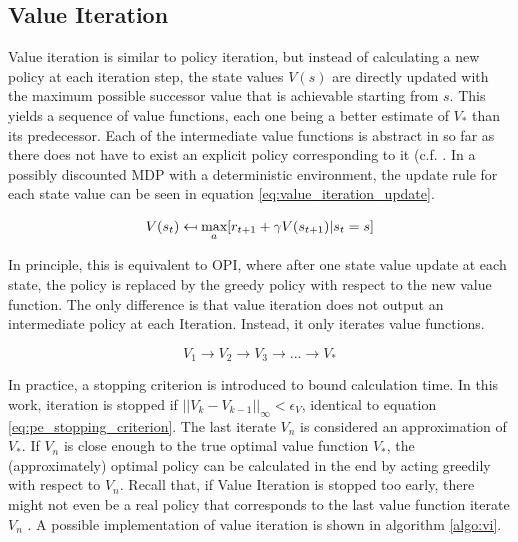 \subsection{Value Iteration}
\label{subsection:VI}
Value iteration is similar to policy iteration, but instead of calculating a new policy at each iteration step, the state values $V(s)$ are directly updated with the maximum possible successor value that is achievable starting from $s$. This yields a sequence of value functions, each one being a better estimate of $V_*$ than its predecessor. Each of the intermediate value functions is abstract in so far as there does not have to exist an explicit policy corresponding to it (c.f. \cite[lecture~3]{Silver2015}. In a possibly discounted MDP with a deterministic environment, the update rule for each state value can be seen in equation \ref{eq:value_iteration_update}.

\begin{equation}
V(s_t) \mathrel{\reflectbox{\ensuremath{\mapsto}}} 
\underset{a}{\text{max}}[r_{t+1}+\gamma V(s_{t+1})|s_t=s]
\label{eq:value_iteration_update}
\end{equation}

In principle, this is equivalent to OPI, where after one state value update at each state, the policy is replaced by the greedy policy with respect to the new value function. The only difference is that value iteration does not output an intermediate policy at each Iteration. Instead, it only iterates value functions. 

\begin{equation*}
V_1 \longrightarrow V_2 \longrightarrow V_3 \longrightarrow ... \longrightarrow  V_*
\label{eq:vi_scheme}
\end{equation*}

In practice, a stopping criterion is introduced to bound calculation time. In this work, iteration is stopped if $||V_{k}-V_{k-1}||_\infty<\epsilon_V$, identical to equation \ref{eq:pe_stopping_criterion}. The last iterate $V_n$ is considered an approximation of $V_*$. If $V_n$ is close enough to the true optimal value function $V_*$, the (approximately) optimal policy can be calculated in the end by acting greedily with respect to $V_n$. Recall that, if Value Iteration is stopped too early, there might not even be a real policy that corresponds to the last value function iterate $V_n$ \cite[lecture~3]{Silver2015}. A possible implementation of value iteration is shown in algorithm \ref{algo:vi}.

